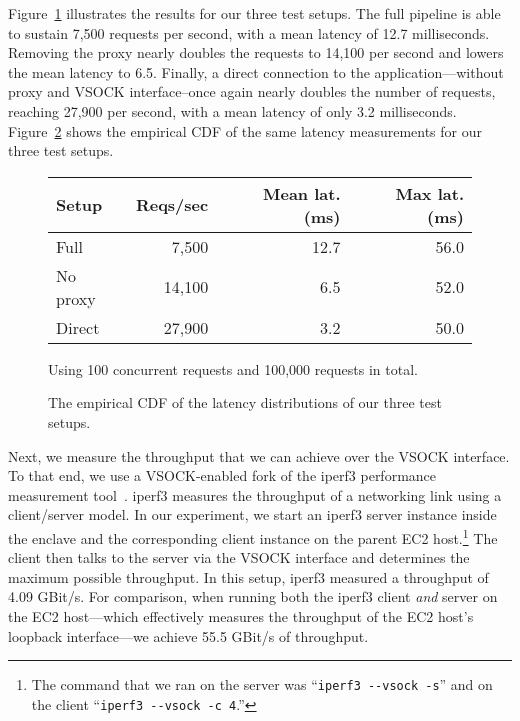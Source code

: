 Figure~\ref{fig:latency-msmts} illustrates the results for our three test
setups.  The full pipeline is able to sustain 7,500 requests per second, with a
mean latency of 12.7 milliseconds.  Removing the proxy nearly doubles the
requests to 14,100 per second and lowers the mean latency to 6.5.  Finally, a
direct connection to the application---without proxy and VSOCK interface--once
again nearly doubles the number of requests, reaching 27,900 per second, with a
mean latency of only 3.2 milliseconds.  Figure~\ref{fig:latency-cdf} shows the
empirical CDF of the same latency measurements for our three test setups.

\begin{figure}[t]
    \centering
    \begin{tabular}{l r r r}
    \toprule
      Setup & Reqs/sec & Mean lat. (ms) & Max lat. (ms) \\
    \midrule
    Full & 7,500 & 12.7 & 56.0 \\
    No proxy & 14,100 & 6.5 & 52.0 \\
    Direct & 27,900 & 3.2 & 50.0 \\
    \bottomrule
    \end{tabular}
    \caption{Using 100 concurrent requests and 100,000 requests in total.}
    \label{fig:latency-msmts}
\end{figure}


\begin{figure}[t]
    \centering
    
    \label{fig:latency-cdf}
    \caption{The empirical CDF of the latency distributions of our three test setups.}
\end{figure}

Next, we measure the throughput that we can achieve over the VSOCK interface.
To that end, we use a VSOCK-enabled fork of the iperf3 performance measurement
tool~\cite{iperf-vsock}.  iperf3 measures the throughput of a networking link
using a client/server model.  In our experiment, we start an iperf3 server
instance inside the enclave and the corresponding client instance on the parent
EC2 host.\footnote{The command that we ran on the server was
``\texttt{iperf3 -{}-vsock -s}'' and on the client ``\texttt{iperf3 -{}-vsock -c
4}.''} The client then talks to the server via the VSOCK interface and
determines the maximum possible throughput.  In this setup, iperf3 measured a
throughput of 4.09 GBit/s.  For comparison, when running both the iperf3 client
\emph{and} server on the EC2 host---which effectively measures the
throughput of the EC2 host's loopback interface---we achieve 55.5 GBit/s of
throughput.

